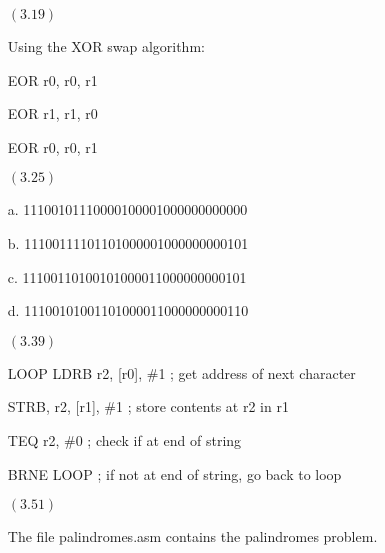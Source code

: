 \documentclass[letterpaper,10pt,titlepage]{article}
\begin{document}
\begin{enumerate}
\item[$(3.19)$]   
  
  Using the XOR swap algorithm:
  
  EOR r0, r0, r1
  
  EOR r1, r1, r0
  
  EOR r0, r0, r1

\item[$(3.25)$]
  
  a. 11100101110000100001000000000000
  
  b. 11100111101101000001000000000101
  
  c. 11100110100101000011000000000101
  
  d. 11100101001101000011000000000110
  
\item[$(3.39)$]

LOOP	LDRB r2, [r0], \#1	; get address of next character

		STRB, r2, [r1], \#1	; store contents at r2 in r1

		TEQ r2, \#0			; check if at end of string

		BRNE LOOP			; if not at end of string, go back to loop
		
  
\item[$(3.51)$]
  
  The file palindromes.asm contains the palindromes problem. 
  
\end{enumerate}
\end{document}
